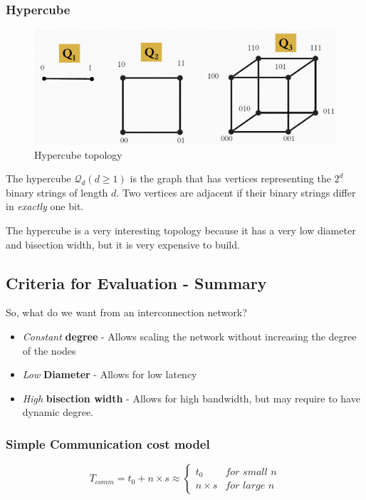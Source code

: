 \subsubsection{Hypercube}
\begin{figure}[htbp]
   \centering
   \includegraphics{images/05/hypercube1.png}
   \caption{Hypercube topology}
   \label{fig:05/hypercube1}
\end{figure}

The hypercube $\mathcal{Q}_d(d\geq1)$ is the graph that has vertices representing the $2^d$ binary strings of length $d$. Two vertices are adjacent if their binary strings differ in \textit{exactly} one bit.

The hypercube is a very interesting topology because it has a very low diameter and bisection width, but it is very expensive to build.

\subsection{Criteria for Evaluation - Summary}
So, what do we want from an interconnection network?

\begin{itemize}
   \item \textit{Constant} \textbf{degree} - Allows scaling the network without increasing the degree of the nodes
   \item \textit{Low} \textbf{Diameter} - Allows for low latency
   \item \textit{High} \textbf{bisection width} - Allows for high bandwidth, but may require to have dynamic degree.
\end{itemize}

\subsubsection{Simple Communication cost model}
\begin{equation}
   T_{comm} = t_0 + n \times s \approx \begin{cases}
      t_0 & \textit{for small n}\\
      n \times s & \textit{for large n}
   \end{cases}
\end{equation}

